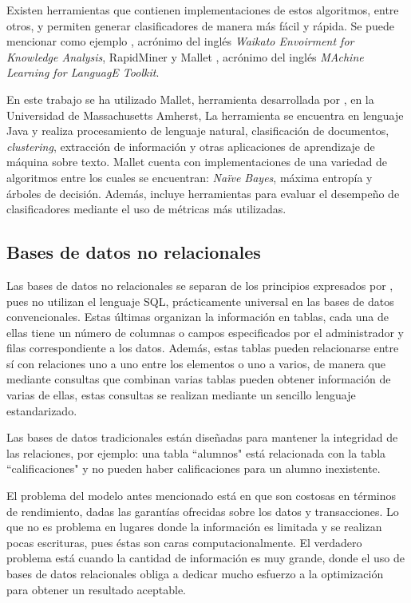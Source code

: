 Existen herramientas que contienen implementaciones de estos algoritmos, entre otros, y permiten generar clasificadores de manera más fácil y rápida. Se puede mencionar como ejemplo \citep{Weka}, acrónimo del inglés \textit{Waikato Envoirment for Knowledge Analysis}, RapidMiner \citep{RapidMiner} y Mallet \citep{Mallet}, acrónimo del inglés \textit{MAchine Learning for LanguagE Toolkit}.

En este trabajo se ha utilizado Mallet, herramienta desarrollada por \citep{Mallet}, en la Universidad de Massachusetts Amherst, La herramienta se encuentra en lenguaje Java y realiza procesamiento de lenguaje natural, clasificación de documentos, \textit{clustering}, extracción de información y otras aplicaciones de aprendizaje de máquina sobre texto. Mallet cuenta con implementaciones de una variedad de algoritmos entre los cuales se encuentran: \textit{Naïve Bayes}, máxima entropía y árboles de decisión. Además, incluye herramientas para evaluar el desempeño de clasificadores mediante el uso de métricas más utilizadas.

\subsection{Bases de datos no relacionales}
\label{subsubsec:BDNoSQL}

Las bases de datos no relacionales se separan de los principios expresados por \citep{CoddSQL}, pues no utilizan el lenguaje SQL, prácticamente universal en las bases de datos convencionales. Estas últimas organizan la información en tablas, cada una de ellas tiene un número de columnas o campos especificados por el administrador y  filas correspondiente a los datos. Además, estas tablas pueden relacionarse entre sí con relaciones uno a uno entre los elementos o uno a varios, de manera que mediante consultas que combinan varias tablas pueden obtener información de varias de ellas, estas consultas se realizan mediante un sencillo lenguaje estandarizado.

Las bases de datos tradicionales están diseñadas para mantener la integridad de las relaciones, por ejemplo: una tabla ``alumnos" está relacionada con la tabla ``calificaciones" y no pueden haber calificaciones para un alumno inexistente. 

El problema del modelo antes mencionado está en que son costosas en términos de rendimiento, dadas las garantías ofrecidas sobre los datos y transacciones. Lo que no es problema en lugares donde la información es limitada y se realizan pocas escrituras, pues éstas son caras computacionalmente. El verdadero problema está cuando la cantidad de información es muy grande, donde el uso de bases de datos relacionales obliga a dedicar mucho esfuerzo a la optimización para obtener un resultado aceptable.

